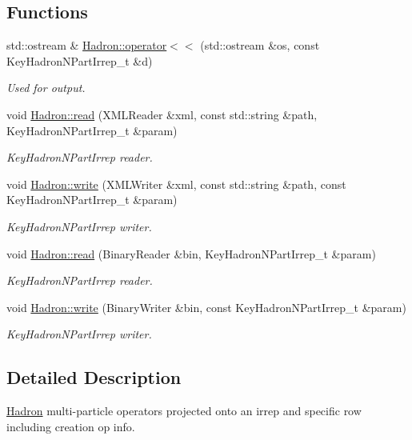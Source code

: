 \subsection*{Functions}
\begin{DoxyCompactItemize}
\item 
std\+::ostream \& \mbox{\hyperlink{namespaceHadron_a8b41635ad70840ac7fc9ebff331876e4}{Hadron\+::operator$<$$<$}} (std\+::ostream \&os, const Key\+Hadron\+N\+Part\+Irrep\+\_\+t \&d)
\begin{DoxyCompactList}\small\item\em Used for output. \end{DoxyCompactList}\item 
void \mbox{\hyperlink{namespaceHadron_a9e39323c40f07b97b83923c9bfd452b3}{Hadron\+::read}} (X\+M\+L\+Reader \&xml, const std\+::string \&path, Key\+Hadron\+N\+Part\+Irrep\+\_\+t \&param)
\begin{DoxyCompactList}\small\item\em Key\+Hadron\+N\+Part\+Irrep reader. \end{DoxyCompactList}\item 
void \mbox{\hyperlink{namespaceHadron_a649265e2213fc38a7907196da52300cd}{Hadron\+::write}} (X\+M\+L\+Writer \&xml, const std\+::string \&path, const Key\+Hadron\+N\+Part\+Irrep\+\_\+t \&param)
\begin{DoxyCompactList}\small\item\em Key\+Hadron\+N\+Part\+Irrep writer. \end{DoxyCompactList}\item 
void \mbox{\hyperlink{namespaceHadron_a39c4036ab90e294b04374fa9d1879ec4}{Hadron\+::read}} (Binary\+Reader \&bin, Key\+Hadron\+N\+Part\+Irrep\+\_\+t \&param)
\begin{DoxyCompactList}\small\item\em Key\+Hadron\+N\+Part\+Irrep reader. \end{DoxyCompactList}\item 
void \mbox{\hyperlink{namespaceHadron_a38af8457b328042ae00ad011656edc71}{Hadron\+::write}} (Binary\+Writer \&bin, const Key\+Hadron\+N\+Part\+Irrep\+\_\+t \&param)
\begin{DoxyCompactList}\small\item\em Key\+Hadron\+N\+Part\+Irrep writer. \end{DoxyCompactList}\end{DoxyCompactItemize}


\subsection{Detailed Description}
\mbox{\hyperlink{namespaceHadron}{Hadron}} multi-\/particle operators projected onto an irrep and specific row including creation op info. 

